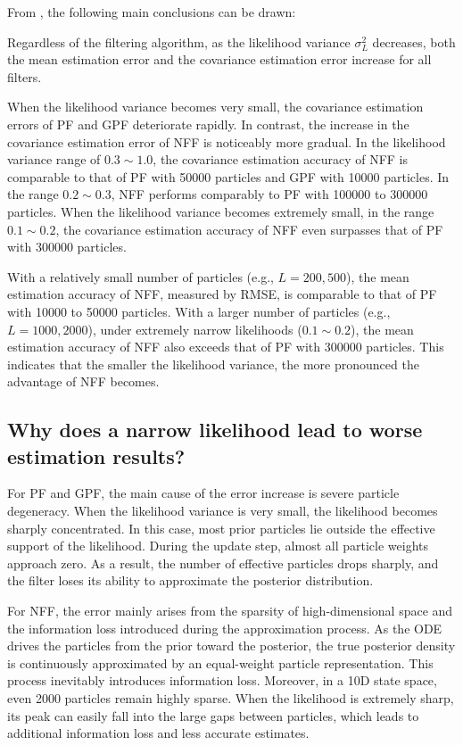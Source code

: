 From , the following main conclusions can be drawn:

Regardless of the filtering algorithm, as the likelihood variance $\sigma_L^2$ decreases, both the mean estimation error and the covariance estimation error increase for all filters.

When the likelihood variance becomes very small, the covariance estimation errors of PF and GPF deteriorate rapidly. In contrast, the increase in the covariance estimation error of NFF is noticeably more gradual. In the likelihood variance range of $0.3 \sim 1.0$, the covariance estimation accuracy of NFF is comparable to that of PF with 50000 particles and GPF with 10000 particles. In the range $0.2 \sim 0.3$, NFF performs comparably to PF with 100000 to 300000 particles. When the likelihood variance becomes extremely small, in the range $0.1 \sim 0.2$, the covariance estimation accuracy of NFF even surpasses that of PF with 300000 particles.

With a relatively small number of particles (e.g., $L=200, 500$), the mean estimation accuracy of NFF, measured by RMSE, is comparable to that of PF with 10000 to 50000 particles. With a larger number of particles (e.g., $L=1000, 2000$), under extremely narrow likelihoods ($0.1 \sim 0.2$), the mean estimation accuracy of NFF also exceeds that of PF with 300000 particles. This indicates that the smaller the likelihood variance, the more pronounced the advantage of NFF becomes.

\subsection*{Why does a narrow likelihood lead to worse estimation results?}

For PF and GPF, the main cause of the error increase is severe particle degeneracy. When the likelihood variance is very small, the likelihood becomes sharply concentrated. In this case, most prior particles lie outside the effective support of the likelihood. During the update step, almost all particle weights approach zero. As a result, the number of effective particles drops sharply, and the filter loses its ability to approximate the posterior distribution.

For NFF, the error mainly arises from the sparsity of high-dimensional space and the information loss introduced during the approximation process. As the ODE drives the particles from the prior toward the posterior, the true posterior density is continuously approximated by an equal-weight particle representation. This process inevitably introduces information loss. Moreover, in a 10D state space, even 2000 particles remain highly sparse. When the likelihood is extremely sharp, its peak can easily fall into the large gaps between particles, which leads to additional information loss and less accurate estimates.

